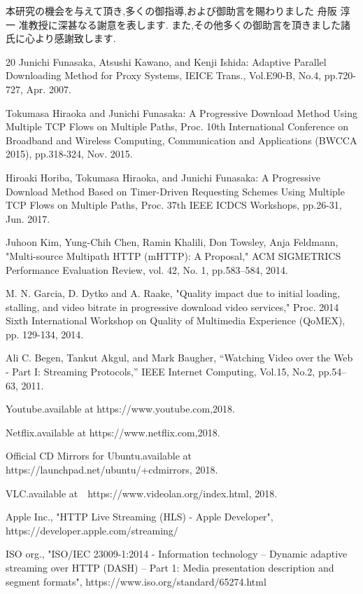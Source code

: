 \documentclass[a4j,12pt]{gradthesis_utf8}
\begin{document}
\clearpage
%
\begin{acknowledgment}
 本研究の機会を与えて頂き,多くの御指導,および御助言を賜わりました
舟阪 淳一 准教授に深甚なる謝意を表します.
また,その他多くの御助言を頂きました諸氏に心より感謝致します.
\end{acknowledgment}
\begin{flushleft}
\begin {thebibliography}{20} 
Junichi Funasaka, Atsushi Kawano, and Kenji Ishida: Adaptive Parallel Downloading Method for Proxy Systems, IEICE Trans., Vol.E90-B, No.4, pp.720-727, Apr. 2007.

Tokumasa Hiraoka and Junichi Funasaka: A Progressive Download Method Using Multiple TCP Flows on Multiple Paths, Proc. 10th International Conference on Broadband and Wireless Computing, Communication and Applications (BWCCA 2015), pp.318-324, Nov. 2015. 

Hiroaki Horiba, Tokumasa Hiraoka, and Junichi Funasaka: A Progressive Download Method Based on Timer-Driven Requesting Schemes Using Multiple TCP Flows on Multiple Paths, Proc. 37th IEEE ICDCS Workshops, pp.26-31, Jun. 2017.

Juhoon Kim, Yung-Chih Chen, Ramin Khalili, Don Towsley, Anja Feldmann,
"Multi-source Multipath HTTP (mHTTP): A Proposal,"
ACM SIGMETRICS Performance Evaluation Review, vol. 42, No. 1, pp.583--584, 2014.

M. N. Garcia, D. Dytko and A. Raake, "Quality impact due to initial loading, stalling, and video bitrate in progressive download video services," Proc. 2014 Sixth International Workshop on Quality of Multimedia Experience (QoMEX), pp. 129-134, 2014.

Ali C. Begen, Tankut Akgul, and Mark Baugher, ``Watching Video over the Web - Part I: Streaming
Protocols,'' IEEE Internet Computing, Vol.15, No.2, pp.54--63, 2011.

Youtube.available at https://www.youtube.com,2018.

Netflix.available at https://www.netflix.com,2018.

Official CD Mirrors for Ubuntu.available at https://launchpad.net/ubuntu/+cdmirrors, 2018.

VLC.available at　https://www.videolan.org/index.html, 2018.

Apple Inc., "HTTP Live Streaming (HLS) - Apple Developer", https://developer.apple.com/streaming/

ISO org., "ISO/IEC 23009-1:2014 - Information technology -- Dynamic adaptive streaming over HTTP (DASH) -- Part 1: Media presentation description and segment formats", https://www.iso.org/standard/65274.html
\end {thebibliography}
\end{flushleft}
\end{document}

